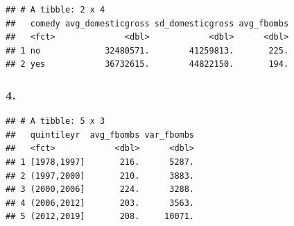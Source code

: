 \documentclass[]{article}
\newenvironment{Shaded}{\begin{snugshade}}{\end{snugshade}}
\newcommand{\DataTypeTok}[1]{\textcolor[rgb]{0.13,0.29,0.53}{#1}}
\newcommand{\DecValTok}[1]{\textcolor[rgb]{0.00,0.00,0.81}{#1}}
\newcommand{\KeywordTok}[1]{\textcolor[rgb]{0.13,0.29,0.53}{\textbf{#1}}}
\newcommand{\NormalTok}[1]{#1}
\newcommand{\OperatorTok}[1]{\textcolor[rgb]{0.81,0.36,0.00}{\textbf{#1}}}
\newcommand{\StringTok}[1]{\textcolor[rgb]{0.31,0.60,0.02}{#1}}
\begin{document}
\begin{Shaded}
\end{Shaded}

\begin{verbatim}
## # A tibble: 2 x 4
##   comedy avg_domesticgross sd_domesticgross avg_fbombs
##   <fct>              <dbl>            <dbl>      <dbl>
## 1 no             32480571.        41259813.       225.
## 2 yes            36732615.        44822150.       194.
\end{verbatim}

\hypertarget{section-3}{%
\subsubsection{4.}\label{section-3}}

\begin{Shaded}
\end{Shaded}

\begin{verbatim}
## # A tibble: 5 x 3
##   quintileyr  avg_fbombs var_fbombs
##   <fct>            <dbl>      <dbl>
## 1 [1978,1997]       216.      5287.
## 2 (1997,2000]       210.      3883.
## 3 (2000,2006]       224.      3288.
## 4 (2006,2012]       203.      3563.
## 5 (2012,2019]       208.     10071.
\end{verbatim}
\end{document}
